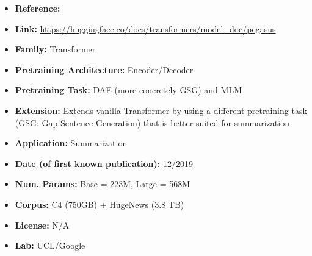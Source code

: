 \documentclass{article}
\begin{document}
            \begin{itemize}
                \item \textbf{Reference:} 
                \item \textbf{Link:} \url{https://huggingface.co/docs/transformers/model_doc/pegasus}
                \item \textbf{Family:}  Transformer
                \item \textbf{Pretraining Architecture:} Encoder/Decoder
                \item \textbf{Pretraining Task:} DAE (more concretely GSG) and MLM
                \item \textbf{Extension:} Extends vanilla Transformer by using a different pretraining task (GSG: Gap Sentence Generation) that is better suited for summarization  
                \item \textbf{Application:} Summarization
                \item \textbf{Date (of first known publication):} 12/2019
                \item \textbf{Num. Params:} Base = 223M, Large = 568M
                \item \textbf{Corpus:} C4 (750GB) + HugeNews (3.8 TB)
                \item \textbf{License:} N/A
                \item \textbf{Lab:} UCL/Google
            \end{itemize}

\end{document}
